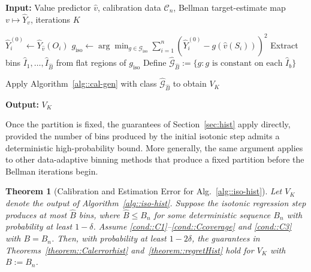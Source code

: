 \documentclass{article}
\newcommand{\BCINPUT}{\STATE \textbf{Input: }}
\newcommand{\BCOUTPUT}{\STATE \textbf{Output: }}
\theoremstyle{plain}
\newtheorem{theorem}{Theorem}
\theoremstyle{definition}
\theoremstyle{remark}
\begin{document}
\begin{algorithm}[t]
\caption{\textbf{Iso--Hist Iterated Bellman Calibration}}
\label{alg::iso-hist}
\begin{algorithmic}[1]

\BCINPUT Value predictor $\hat{v}$, calibration data $\mathcal C_n$,
Bellman target-estimate map $v\mapsto\widehat Y_v$, iterations $K$

\STATE \hspace{1em} $\widehat Y_i^{(0)} \gets \widehat Y_{\hat v}(O_i)$
\STATE \hspace{1em} $g_{\mathrm{iso}} \gets 
       \arg\min_{g \in \mathcal G_{\mathrm{iso}}}
       \sum_{i=1}^n (\widehat Y_i^{(0)} - g(\hat{v}(S_i)))^2$
\STATE \hspace{1em} Extract bins $\hat I_1,\dots,\hat I_{\hat B}$
       from flat regions of $g_{\mathrm{iso}}$
\STATE \hspace{1em} Define $\widehat{\mathcal G}_{\hat B} :=
       \{g:g  \text{ is constant on each }\hat I_b\}$

\STATE \hspace{1em} Apply Algorithm~\ref{alg::cal-gen} with class 
       $\widehat{\mathcal G}_{\hat B}$ to obtain $V_K$

\BCOUTPUT $V_K$

\end{algorithmic}
\end{algorithm}

Once the partition is fixed, the guarantees of Section~\ref{sec:hist} apply
directly, provided the number of bins produced by the initial isotonic step
admits a deterministic high-probability bound. More generally, the same
argument applies to other data-adaptive binning methods that produce a fixed
partition before the Bellman iterations begin.

\begin{theorem}[Calibration and Estimation Error for Alg.~\ref{alg::iso-hist}]
\label{theorem::regretiso}
Let $V_K$ denote the output of Algorithm~\ref{alg::iso-hist}. Suppose
the isotonic regression step produces at most $\hat B$ bins, where 
$\hat B \le B_n$ for some deterministic sequence $B_n$ with probability at least $1 - \delta$. Assume \ref{cond::C1}--\ref{cond::Ccoverage} and \ref{cond::C3} with $B = B_n$.
Then, with probability at least $1 - 2\delta$, the guarantees in
Theorems~\ref{theorem::Calerrorhist} and~\ref{theorem::regretHist} hold for
$V_K$ with $B := B_n$.
\end{theorem}
\end{document}
